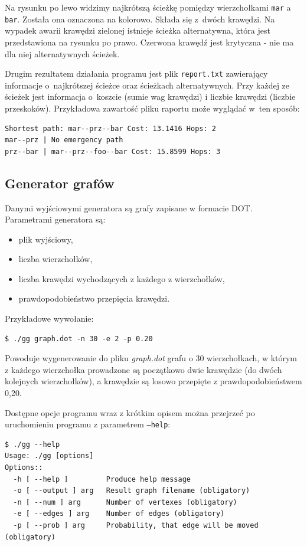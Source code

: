 \documentclass[a4paper, 12pt]{article}
\begin{document}
Na rysunku po lewo widzimy najkrótszą ścieżkę pomiędzy wierzchołkami \texttt{mar} a \texttt{bar}. Została ona oznaczona na kolorowo. Składa się z~dwóch krawędzi. Na wypadek awarii krawędzi zielonej istnieje ścieżka alternatywna, która jest przedstawiona na rysunku po prawo. Czerwona krawędź jest krytyczna - nie ma dla niej alternatywnych ścieżek.

Drugim rezultatem działania programu jest plik \texttt{report.txt} zawierający informacje o~najkrótszej ścieżce oraz ścieżkach alternatywnych. Przy każdej ze ścieżek jest informacja o~koszcie (sumie wag krawędzi) i liczbie krawędzi (liczbie przeskoków). Przykładowa zawartość pliku raportu może wyglądać w~ten sposób:

\begin{verbatim}
Shortest path: mar--prz--bar Cost: 13.1416 Hops: 2
mar--prz | No emergency path
prz--bar | mar--prz--foo--bar Cost: 15.8599 Hops: 3
\end{verbatim}

\subsection{Generator grafów}

Danymi wyjściowymi generatora są grafy zapisane w formacie DOT. Parametrami generatora są:

\begin{itemize}
\item plik wyjściowy,
\item liczba wierzchołków,
\item liczba krawędzi wychodzących z każdego z wierzchołków,
\item prawdopodobieństwo przepięcia krawędzi.
\end{itemize}

Przykładowe wywołanie:

\begin{verbatim}
$ ./gg graph.dot -n 30 -e 2 -p 0.20
\end{verbatim}

Powoduje wygenerowanie do pliku {\it graph.dot} grafu o 30 wierzchołkach, w którym z każdego wierzchołka prowadzone są początkowo dwie krawędzie (do dwóch kolejnych wierzchołków), a krawędzie są losowo przepięte z prawdopodobieństwem 0,20.

Dostępne opcje programu wraz z krótkim opisem można przejrzeć po uruchomieniu programu z parametrem \texttt{--help}:

\begin{verbatim}
$ ./gg --help
Usage: ./gg [options]
Options::
  -h [ --help ]         Produce help message
  -o [ --output ] arg   Result graph filename (obligatory)
  -n [ --num ] arg      Number of vertexes (obligatory)
  -e [ --edges ] arg    Number of edges (obligatory)
  -p [ --prob ] arg     Probability, that edge will be moved (obligatory)
\end{verbatim}
\end{document}

